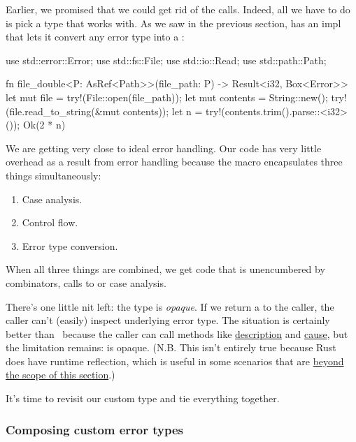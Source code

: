 Earlier, we promised that we could get rid of the  calls. Indeed, all we have to do is pick a type that 
 works with. As we saw in the previous section,  has an impl that lets it convert any error type into 
a :

\begin{rustc}
use std::error::Error;
use std::fs::File;
use std::io::Read;
use std::path::Path;

fn file_double<P: AsRef<Path>>(file_path: P) -> Result<i32, Box<Error>> {
    let mut file = try!(File::open(file_path));
    let mut contents = String::new();
    try!(file.read_to_string(&mut contents));
    let n = try!(contents.trim().parse::<i32>());
    Ok(2 * n)
}
\end{rustc}

We are getting very close to ideal error handling. Our code has very little overhead as a result from error handling because 
the  macro encapsulates three things simultaneously:

\begin{enumerate}
  \item{Case analysis.}
  \item{Control flow.}
  \item{Error type conversion.}
\end{enumerate}

When all three things are combined, we get code that is unencumbered by combinators, calls to  or case analysis.

\blank

There's one little nit left: the  type is \emph{opaque}. If we return a  to the caller, 
the caller can't (easily) inspect underlying error type. The situation is certainly better than \String\ because the caller 
can call methods like 
\href{https://doc.rust-lang.org/std/error/trait.Error.html\#tymethod.description}{description} and 
\href{https://doc.rust-lang.org/std/error/trait.Error.html\#method.cause}{cause}, but the limitation remains:  
is opaque. (N.B. This isn't entirely true because Rust does have runtime reflection, which is useful in some scenarios that are
\href{https://crates.io/crates/error}{beyond the scope of this section}.)

\blank

It's time to revisit our custom  type and tie everything together.

\subsubsection*{Composing custom error types}

